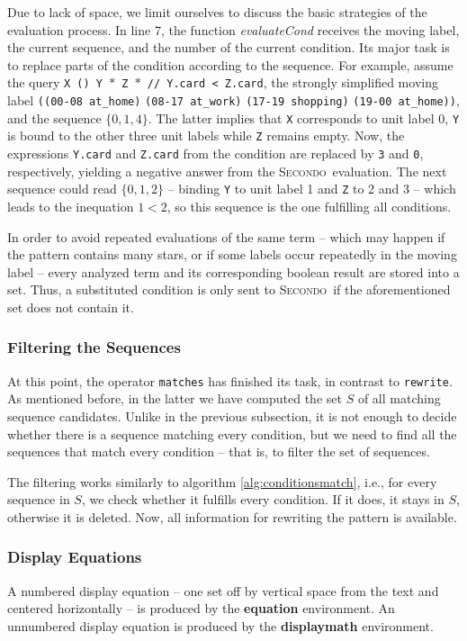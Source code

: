\documentclass{sig-alternate}
\newcommand{\ic}[1]{\textit{#1}}
\newcommand{\secondo}{\textsc{Secondo}}
\begin{document}
Due to lack of space, we limit ourselves to discuss the basic strategies of the evaluation process. In line 7, the function \ic{evaluateCond} receives the moving label, the current sequence, and the number of the current condition. Its major task is to replace parts of the condition according to the sequence. For example, assume the query \texttt{X () Y $\ast$ Z $\ast$ // Y.card < Z.card}, the strongly simplified moving label \texttt{((00-08 at\_home)} \texttt{(08-17 at\_work)} \texttt{(17-19 shopping)} \texttt{(19-00 at\_home))}, and the sequence $\{0,1,4\}$. The latter implies that \texttt{X} corresponds to unit label 0, \texttt{Y} is bound to the other three unit labels while \texttt{Z} remains empty. Now, the expressions \texttt{Y.card} and \texttt{Z.card} from the condition are replaced by \texttt{3} and \texttt{0}, respectively, yielding a negative answer from the \secondo\ evaluation. The next sequence could read $\{0,1,2\}$ -- binding \texttt{Y} to unit label 1 and \texttt{Z} to 2 and 3 -- which leads to the inequation $1<2$, so this sequence is the one fulfilling all conditions.

In order to avoid repeated evaluations of the same term -- which may happen if the pattern contains many stars, or if some labels occur repeatedly in the moving label -- every analyzed term and its corresponding boolean result are stored into a set. Thus, a substituted condition is only sent to \secondo\ if the aforementioned set does not contain it.

\subsubsection{Filtering the Sequences}
At this point, the operator \texttt{matches} has finished its task, in contrast to \texttt{rewrite}. As mentioned before, in the latter we have computed the set $S$ of all matching sequence candidates. Unlike in the previous subsection, it is not enough to decide whether there is a sequence matching every condition, but we need to find all the sequences that match every condition -- that is, to filter the set of sequences.

The filtering works similarly to algorithm \ref{alg:conditionsmatch}, i.e., for every sequence in $S$, we check whether it fulfills every condition. If it does, it stays in $S$, otherwise it is deleted. Now, all information for rewriting the pattern is available.
\newpage

\subsubsection{Display Equations}
A numbered display equation -- one set off by vertical space
from the text and centered horizontally -- is produced
by the \textbf{equation} environment. An unnumbered display
equation is produced by the \textbf{displaymath} environment.
\end{document}
